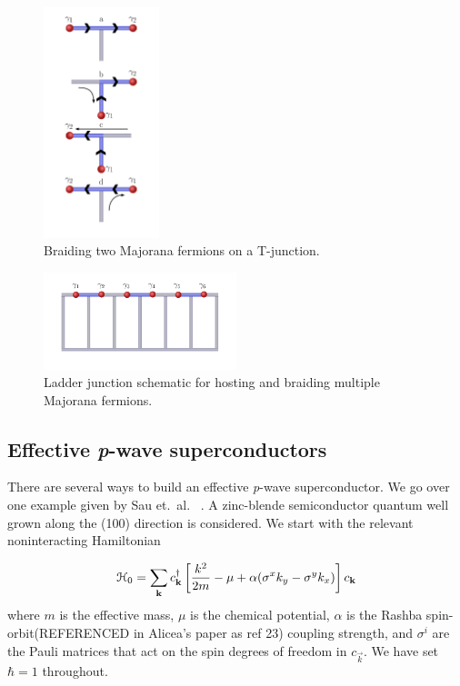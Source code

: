 \begin{figure}
  \includegraphics[width=0.3\textwidth]{./figures/t-junction-braid.pdf}
  \caption{Braiding two Majorana fermions on a T-junction.}
  \label{fig:t-junction-braid}
\end{figure}

\begin{figure}
  \includegraphics[width=0.5\textwidth]{./figures/ladder-junction.pdf}
  \caption{Ladder junction schematic for hosting and braiding multiple Majorana fermions.}
  \label{fig:ladder-junction}
\end{figure}

\subsection{Effective \textit{p}-wave superconductors}
There are several ways to build an effective \textit{p}-wave superconductor.
We go over one example given by Sau et.\ al. ~\cite{sauGenericNewPlatform2010}.
A zinc-blende semiconductor quantum well grown along the (100) direction is considered. We start with the relevant noninteracting Hamiltonian

\begin{equation}
  \mathcal{H}_0 = \sum_{\mathbf{k}}  c^{\dagger}_{\mathbf{k}} \left[\frac{k^2}{2m} - \mu + \alpha ( \sigma^x k_y - \sigma^y k_x) \right] c_{\mathbf{k}}
\end{equation}
where $m$ is the effective mass, $\mu$ is the chemical potential, $\alpha$ is the Rashba spin-orbit(REFERENCED in Alicea's paper as ref 23) coupling strength, and $\sigma^i$ are the Pauli matrices that act on the spin degrees of freedom in $c_{\vec{k}}$. We have set $\hbar=1$ throughout.

